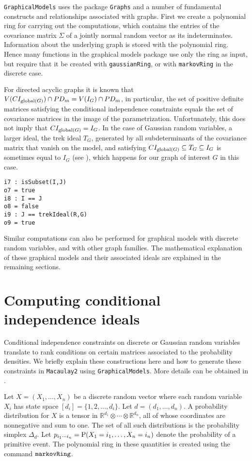 \documentclass[letterpaper]{article}
\theoremstyle{definition}
\begin{document}
 {\tt GraphicalModels} uses the package {\tt Graphs} and a number of fundamental constructs and relationships 
associated with graphs.  First we create a polynomial ring
for carrying out the computations, which contains the entries of
the covariance matrix $\Sigma$ of a jointly normal random vector
as its indeterminates.  Information about the underlying graph is stored with the polynomial ring. 
Hence many functions in the graphical models package use only the ring as input, but require that it be created with {\tt gaussianRing}, or with {\tt markovRing} in the discrete case.

For directed acyclic graphs it is known that 
$V(CI_{{\rm global}(G)}) \cap PD_{m}  =  
V(I_{G}) \cap PD_{m}$,
in particular, the set of positive definite matrices
satisfying the conditional independence constraints equals the set of covariance matrices in the image of the parametrization.
Unfortunately, this does not imply that $CI_{{\rm global}(G)} 
=I_{G}$.  In the case of Gaussian random variables, a larger ideal,
the trek ideal $T_{G}$, generated by all subdeterminants of the 
covariance matrix that vanish on the model, and satisfying
$CI_{{\rm global}(G)} \subseteq T_{G} \subseteq
I_{G}$ is sometimes equal to $I_{G}$ (see \cite{STD}), which happens for our
graph of interest $G$ in this case.

\begin{verbatim}
i7 : isSubset(I,J)
o7 = true
i8 : I == J
o8 = false
i9 : J == trekIdeal(R,G)
o9 = true
\end{verbatim}

Similar computations can also be performed for graphical models
with discrete random variables,
and with other graph families.  The mathematical explanation of
these graphical models and their associated ideals
are explained in the remaining sections.


\section{Computing conditional independence ideals}\label{CI}

Conditional independence constraints on discrete or Gaussian random variables
 translate to rank conditions on certain matrices
associated to the probability densities.  We briefly explain
these constructions here and how to generate these constraints
in {\tt Macaulay2} using {\tt GraphicalModels}.  More details
can be obtained in \cite[Ch.~3]{DSS}.

Let $X = (X_{1}, \ldots, X_{n})$ be a discrete random
vector where each random variable $X_{i}$ has state space
$[d_{i}] = \{1,2, \ldots, d_{i} \}$. Let $d = (d_{1}, \ldots, d_{n})$.  
A probability distribution
for $X$ is a tensor in $\mathbb{R}^{d_{1}}\otimes \cdots \otimes
\mathbb{R}^{d_{n}}$, all of whose 
coordinates are nonnegative and sum to one.
The set of all such distributions is the probability simplex $\Delta_{d}$.
Let $p_{i_{1}\cdots i_{n}} = {\rm P}(X_{1} = i_{1}, \ldots, X_{n} = i_{n})$
denote the probability of a primitive event.  The polynomial
ring in these quantities is created using the command ${\tt markovRing}$.
\end{document}
